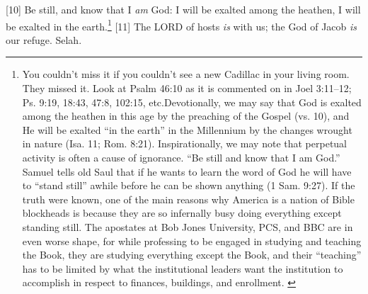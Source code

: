 [10] \textcolor[rgb]{0.00,0.00,1.00}{Be still, and know that I \emph{am} God: I will be exalted among the heathen, I will be exalted in the earth.}\footnote{You couldn’t miss it if you couldn’t see a new Cadillac in your living room. They missed it. Look at Psalm 46:10 as it is commented on in Joel 3:11–12; Ps. 9:19, 18:43, 47:8, 102:15, etc.Devotionally, we may say that God is exalted among the heathen in this age by the preaching of the Gospel (vs. 10), and He will be exalted “in the earth” in the Millennium by the changes wrought in nature (Isa. 11; Rom. 8:21). Inspirationally, we may note that perpetual activity is often a cause of ignorance. “Be still and know that I am God.” Samuel tells old Saul that if he wants to learn the word of God he will have to “stand still” awhile before he can be shown anything (1 Sam. 9:27). If the truth were known, one of the main reasons why America is a nation of Bible blockheads is because they are so infernally busy doing everything except standing still. The apostates at Bob Jones University, PCS, and BBC are in even worse shape, for while professing to be engaged in studying and teaching the Book, they are studying everything except the Book, and their “teaching” has to be limited by what the institutional leaders want the institution to accomplish in respect to finances, buildings, and enrollment. \cite{Ruckman1992Psalms}}
[11] \textcolor[rgb]{0.00,0.00,1.00}{The LORD of hosts \emph{is} with us; the God of Jacob \emph{is} our refuge. Selah.}

